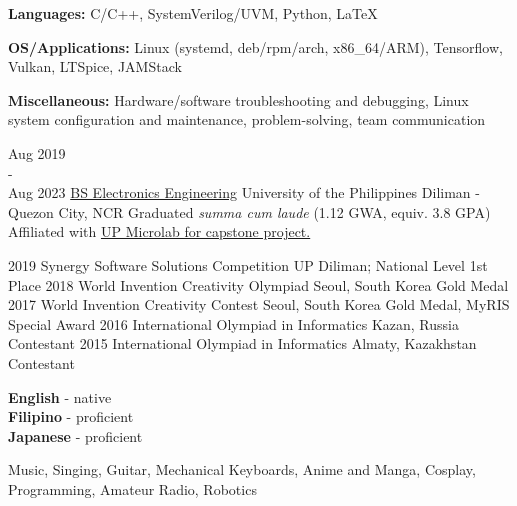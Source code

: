 \documentclass[9pt]{developercv}
\begin{document}
\hfill 
\begin{minipage}[t]{0.475\textwidth} 
	\vspace{-\baselineskip}


	\textbf{Languages:} C/C++, SystemVerilog/UVM, Python, LaTeX

	\textbf{OS/Applications:} Linux (systemd, deb/rpm/arch, x86\_64/ARM), Tensorflow, Vulkan, LTSpice, JAMStack

	\textbf{Miscellaneous:} Hardware/software troubleshooting and debugging, Linux system configuration and maintenance, problem-solving, team communication

	
	\begin{entrylist}
		\entry
			{Aug 2019 \\ - \\ Aug 2023}
			{\href{https://www.eee.upd.edu.ph/undergraduate-programs/bs-electronics-and-communications-engineering}{BS Electronics Engineering}}
			{University of the Philippines Diliman - Quezon City, NCR}
			{Graduated \emph{summa cum laude} (1.12 GWA, equiv. 3.8 GPA)\\
			Affiliated with \href{https://www.up-microlab.org/}{UP Microlab for capstone project.}}
	\end{entrylist}
	\cvsect{Achievements}
	\begin{entrylist}
		\entry
			{2019}
			{Synergy Software Solutions Competition}
			{UP Diliman; National Level}
			{1st Place}
		\entry
			{2018}
			{World Invention Creativity Olympiad}
			{Seoul, South Korea}
			{Gold Medal}
		\entry
			{2017}
			{World Invention Creativity Contest}
			{Seoul, South Korea}
			{Gold Medal, MyRIS Special Award}
		\entry
			{2016}
			{International Olympiad in Informatics}
			{Kazan, Russia}
			{Contestant}
		\entry
			{2015}
			{International Olympiad in Informatics}
			{Almaty, Kazakhstan}
			{Contestant}
	\end{entrylist}
\end{minipage}

\vspace{0.5cm}

\begin{minipage}[t]{0.2\textwidth}
	\vspace{-\baselineskip}

	\textbf{English} - native\\
	\textbf{Filipino} - proficient\\
	\textbf{Japanese} - proficient\\
\end{minipage}
\hfill
\begin{minipage}[t]{0.6\textwidth}
	\vspace{-\baselineskip}
	
	Music, Singing, Guitar, Mechanical Keyboards, Anime and Manga, Cosplay, Programming, Amateur Radio, Robotics
\end{minipage}
\end{document}
